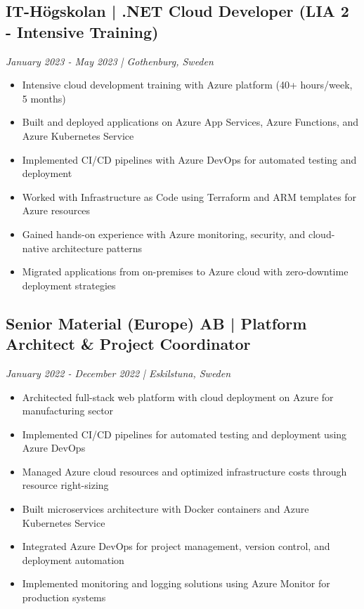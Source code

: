 \documentclass[11pt,a4paper]{article}
\begin{document}
\subsection*{IT-Högskolan | .NET Cloud Developer (LIA 2 - Intensive Training)}
\textit{January 2023 - May 2023 | Gothenburg, Sweden}
\begin{itemize}[noitemsep]
\item Intensive cloud development training with Azure platform (40+ hours/week, 5 months)
\item Built and deployed applications on Azure App Services, Azure Functions, and Azure Kubernetes Service
\item Implemented CI/CD pipelines with Azure DevOps for automated testing and deployment
\item Worked with Infrastructure as Code using Terraform and ARM templates for Azure resources
\item Gained hands-on experience with Azure monitoring, security, and cloud-native architecture patterns
\item Migrated applications from on-premises to Azure cloud with zero-downtime deployment strategies
\end{itemize}

\subsection*{Senior Material (Europe) AB | Platform Architect \& Project Coordinator}
\textit{January 2022 - December 2022 | Eskilstuna, Sweden}
\begin{itemize}[noitemsep]
\item Architected full-stack web platform with cloud deployment on Azure for manufacturing sector
\item Implemented CI/CD pipelines for automated testing and deployment using Azure DevOps
\item Managed Azure cloud resources and optimized infrastructure costs through resource right-sizing
\item Built microservices architecture with Docker containers and Azure Kubernetes Service
\item Integrated Azure DevOps for project management, version control, and deployment automation
\item Implemented monitoring and logging solutions using Azure Monitor for production systems
\end{itemize}
\end{document}
